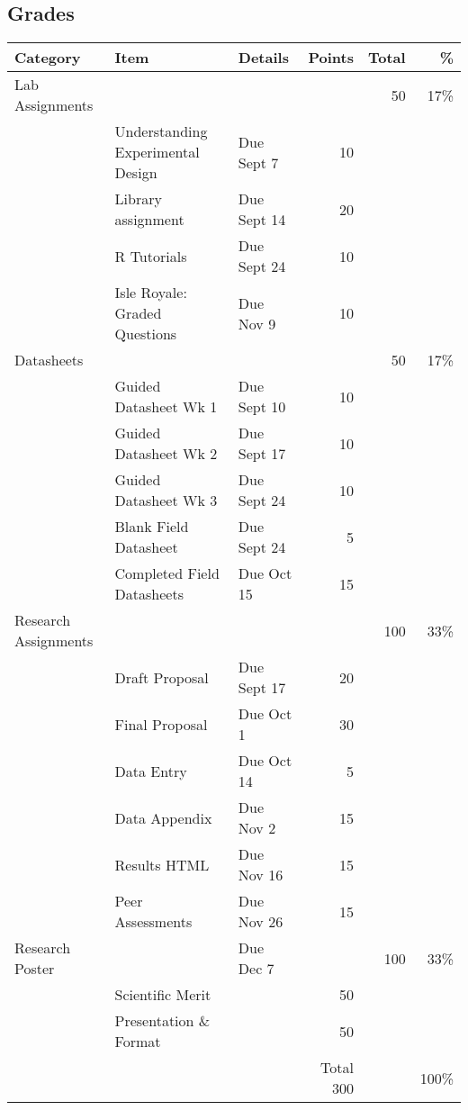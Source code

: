 \documentclass{tufte-handout}
\begin{document}
\begin{fullwidth}






\section{Grades}

				

\begin{tabular}{l l l r r r}
Category & Item & Details & Points  & Total & \% \\
\hline
Lab Assignments & & &  & 50 & 17\% \\
& Understanding Experimental Design & Due Sept 7 &10 \\
& Library assignment & Due Sept 14 & 20 \\
& R Tutorials & Due Sept 24 & 10 \\
& Isle Royale: Graded Questions & Due Nov 9 & 10 \\
\hline
Datasheets & & &  & 50 & 17\% \\
& Guided Datasheet Wk 1 & Due Sept 10 & 10 \\
& Guided Datasheet Wk 2 & Due Sept 17 & 10 \\
& Guided Datasheet Wk 3 & Due Sept 24 & 10 \\
& Blank Field Datasheet & Due Sept 24 & 5 \\
& Completed Field Datasheets & Due Oct 15 & 15 \\
\hline
Research Assignments & & & & 100 & 33\% \\
& Draft Proposal & Due Sept 17 & 20 \\
& Final Proposal & Due Oct 1 & 30 \\
& Data Entry & Due Oct 14 & 5 \\
& Data Appendix & Due Nov 2 & 15 \\
& Results HTML & Due Nov 16 & 15 \\
& Peer Assessments & Due Nov 26 & 15 \\
\hline
Research Poster & & Due Dec 7& & 100 & 33\% \\
& Scientific Merit &  & 50 \\
&  Presentation \& Format && 50 \\
\hline 
& & & Total 300 & & 100\% \\
\end{tabular}

\end{fullwidth}
\end{document}
